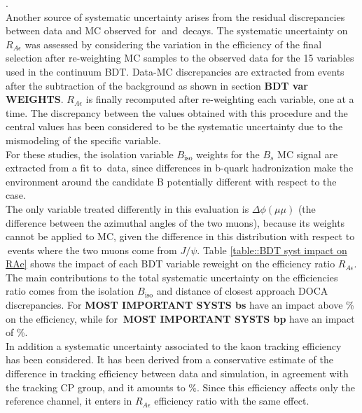 \noindent
{}.\\

\noindent
Another source of systematic uncertainty arises from the residual discrepancies between data and MC observed for \BpKpJpsi $\ $and \BsJpsiPhi $\ $decays. 
The systematic uncertainty on $R_{A\epsilon}$ was assessed by considering the variation in the efficiency of the final selection after re-weighting MC samples to the observed data for the 15 variables used in the continuum BDT. 
Data-MC discrepancies are extracted from \Bp events after the subtraction of the background as shown in section \textbf{BDT var WEIGHTS}.
$R_{A\epsilon}$ is finally recomputed after re-weighting each variable, one at a time. 
The discrepancy between the values obtained with this procedure and the central values has been considered to be the systematic uncertainty due to the mismodeling of the specific variable. \\
For these studies, the isolation variable $B_{\text{iso}}$ weights for the $B_s$ MC signal are extracted from a fit to \BsJpsiPhi $\ $data, since differences in b-quark hadronization make the environment around the candidate B potentially different with respect to the \Bp $\ $case. \\
The only variable treated differently in this evaluation is $\Delta \phi(\mu \mu)$ (the difference between the azimuthal angles of the two muons), because its weights cannot be applied to \Bs MC, given the difference in this distribution with respect to \Bp $\ $events where the two muons come from $J/\psi$.
Table \ref{table::BDT syst impact on RAe} shows the impact of each BDT variable reweight on the efficiency ratio $R_{A\epsilon}$. \\
The main contributions to the total systematic uncertainty on the efficiencies ratio comes from the isolation $B_{\text{iso}}$ and distance of closest approach DOCA discrepancies. For \Bs \textbf{MOST IMPORTANT SYSTS bs} have
 an impact above \% on the efficiency, while for \Bp $\ $\textbf{MOST IMPORTANT SYSTS bp} have an impact of \%.\\

\noindent
In addition a systematic uncertainty associated to the kaon tracking efficiency has been considered. It has been derived from a conservative estimate of the difference in tracking efficiency between data and simulation, in agreement with the tracking CP group, and it amounts to \%. 
Since this efficiency affects only the reference channel, it enters in $R_{A\epsilon}$ efficiency ratio with the same effect.\\
 
